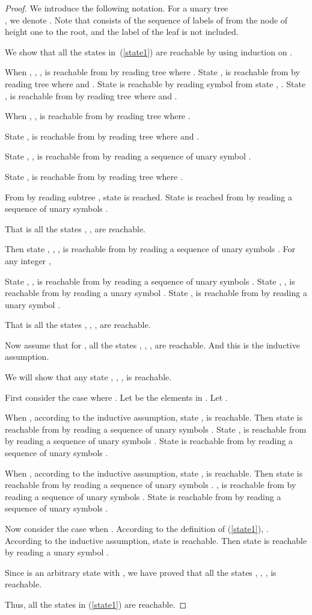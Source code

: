 \documentclass[copyright]{eptcs}
\begin{document}
\begin{proof}
We introduce the following notation. For a unary tree
\\, we denote
. Note that 
consists of the sequence of labels of  from the node of height
one to the root, and the label of the leaf is not included.

We show that all the states in~(\ref{state1}) are reachable
by using induction on .

When , , ,  is reachable from  by reading tree  where
. State ,  is
reachable from  by reading tree 
where  and . State
 is reachable by reading symbol  from state
, . State ,
 is reachable from  by reading
tree  where  and
.

When , ,  is reachable
from  by reading tree  where
.

State , is reachable from  by
reading tree  where  and
.

State , ,  is
reachable from  by reading a sequence of unary
symbol .

State ,  is reachable from
 by reading tree  where
.

From  by reading subtree , state
 is reached. State  is reached
from  by reading a sequence of unary symbols
.

That is all the states , ,  are reachable.

Then state , , ,
 is reachable from 
by reading a sequence of unary symbols . For any integer
,

State , ,  is
reachable from  by reading a sequence of unary
symbols . State , ,  is reachable from  by
reading a unary symbol . State ,  is reachable from  by reading a unary symbol
.

That is all the states , , ,  are reachable.

Now assume that for , all the states ,
, , 
are reachable. And this is the inductive assumption.

We will show that any state , , ,  is reachable.

First consider the case where . Let  be the elements in . Let .

When , according to the inductive assumption,
state , is reachable. Then state
 is reachable from
 by reading a sequence of unary
symbols . State ,  is
reachable from  by
reading a sequence of unary symbols . State  is reachable from  by reading a sequence of unary symbols .

When , according to the inductive assumption, state , is reachable. Then state  is reachable
from  by reading a sequence of unary symbols .
,  is reachable from  by reading a sequence of unary symbols
. State  is reachable from  by reading a sequence of unary symbols
.

Now consider the case when . According to the definition of
(\ref{state1}), . According to the inductive assumption,
state  is reachable. Then state 
is reachable by reading a unary symbol .

Since  is an arbitrary state with , we have
proved that all the states , , ,  is reachable.

Thus, all the states in (\ref{state1}) are reachable.
\end{proof}\endpf
\end{document}

